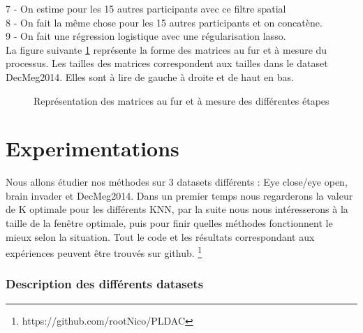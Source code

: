 \documentclass{article}[12pt]
\begin{document}
7 - On estime pour les 15 autres participants avec ce filtre spatial\\
8 - On fait la même chose pour les 15 autres participants et on concatène.\\
9 - On fait une régression logistique avec une régularisation lasso.\\
La figure suivante \ref{fig2} représente la forme des matrices au fur et à mesure du processus. Les tailles des matrices correspondent aux tailles dans le dataset DecMeg2014. Elles sont à lire de gauche à droite et de haut en bas.
\\
\begin{figure}[H]
\label{fig2}
\caption{Représentation des matrices au fur et à mesure des différentes étapes}
\end{figure}

\part{Experimentations}
Nous allons étudier nos méthodes sur 3 datasets différents : Eye close/eye open, brain invader et DecMeg2014. Dans un premier temps nous regarderons la valeur de K optimale pour les différents KNN, par la suite nous nous intéresserons à la taille de la fenêtre optimale, puis pour finir quelles méthodes fonctionnent le mieux selon la situation. Tout le code et les résultats correspondant aux expériences peuvent être trouvés sur github. \footnote{https://github.com/rootNico/PLDAC}
\section{Description des différents datasets}
\end{document}
